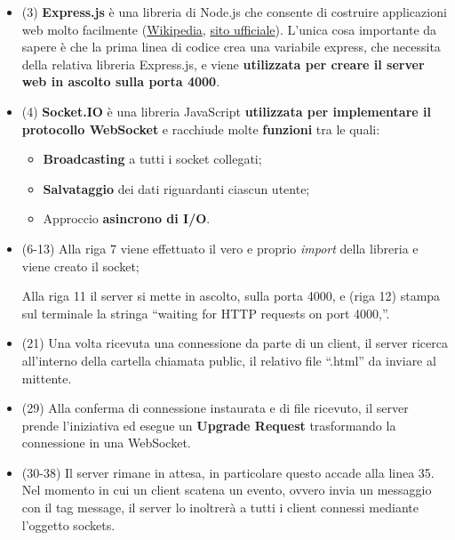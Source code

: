 \documentclass[a4paper]{article}
\newcommand{\dquotes}[1]{``#1''}
\begin{document}
	\begin{itemize}
		\item (3) \textcolor{Red3}{\textbf{Express.js}} è una libreria di Node.js che consente di costruire applicazioni web molto facilmente (\href{https://en.wikipedia.org/wiki/Express.js}{Wikipedia}, \href{https://expressjs.com/}{sito ufficiale}). L'unica cosa importante da sapere è che la prima linea di codice crea una variabile \textsf{express}, che necessita della relativa libreria Express.js, e viene \textbf{utilizzata per creare il server web in ascolto sulla porta 4000}.
		
		\item (4) \textcolor{Red3}{\textbf{Socket.IO}} è una libreria JavaScript \textbf{utilizzata per implementare il protocollo WebSocket} e racchiude molte \textbf{funzioni} tra le quali:
		\begin{itemize}
			\item \textbf{Broadcasting} a tutti i socket collegati;
			
			\item \textbf{Salvataggio} dei dati riguardanti ciascun utente;
			
			\item Approccio \textbf{asincrono di I/O}.
		\end{itemize}
	
		\item (6-13) Alla riga 7 viene effettuato il vero e proprio \emph{import} della libreria e viene creato il socket;
		
		Alla riga 11 il server si mette in ascolto, sulla porta 4000, e (riga 12) stampa sul terminale la stringa \dquotes{waiting for HTTP requests on port 4000,}.
		
		
		\item (21) Una volta ricevuta una connessione da parte di un client, il server ricerca all'interno della cartella chiamata \textsf{public}, il relativo file \dquotes{.html} da inviare al mittente.
		
		\item (29) Alla conferma di connessione instaurata e di file ricevuto, il server prende l'iniziativa ed esegue un \textbf{Upgrade Request} trasformando la connessione in una WebSocket.
		
		\item (30-38) Il server rimane in attesa, in particolare questo accade alla linea 35. Nel momento in cui un client scatena un evento, ovvero invia un messaggio con il tag \textsf{message}, il server lo inoltrerà a tutti i client connessi mediante l'oggetto \textsf{sockets}.
	\end{itemize}
\end{document}

